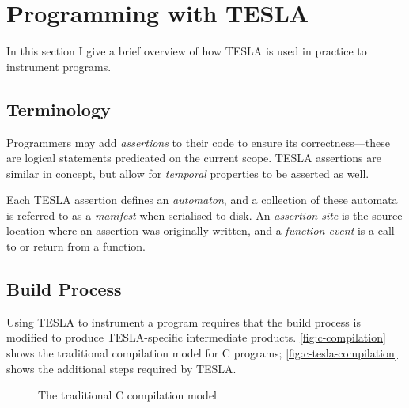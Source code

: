 \section{Programming with TESLA}

In this section I give a brief overview of how TESLA is used in practice
to instrument programs.

\subsection{Terminology}

Programmers may add \emph{assertions} to their code to ensure its
correctness---these are logical statements predicated on the current
scope. TESLA assertions are similar in concept, but allow for
\emph{temporal} properties to be asserted as well.

Each TESLA assertion defines an \emph{automaton}, and a collection of
these automata is referred to as a \emph{manifest} when serialised to
disk. An \emph{assertion site} is the source location where an assertion
was originally written, and a \emph{function event} is a call to or
return from a function.

\subsection{Build Process} \label{sec:build-tesla}

Using TESLA to instrument a program requires that the build process is
modified to produce TESLA-specific intermediate products.
\autoref{fig:c-compilation} shows the traditional compilation model for
C programs; \autoref{fig:c-tesla-compilation} shows the additional
steps required by TESLA.

\begin{figure}[ht]
  \centering
  \caption{The traditional C compilation model}
  \label{fig:c-compilation}
\end{figure}

